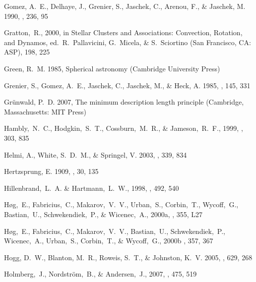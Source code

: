 \begin{thebibliography}{99}
{Gomez}, A.~E., {Delhaye}, J., {Grenier}, S., {Jaschek}, C., {Arenou}, F., \&
  {Jaschek}, M. 1990, \aap, 236, 95

  Gratton,~R., 2000,
  in Stellar Clusters and Associations: Convection, Rotation, and Dynamos,
  ed.~R.~Pallavicini, G.~Micela, \& S.~Sciortino (San Francisco, CA: ASP),
  198, 225


{Green}, R.~M. 1985, {Spherical astronomy} (Cambridge University Press)

{Grenier}, S., {Gomez}, A.~E., {Jaschek}, C., {Jaschek}, M., \& {Heck}, A.
  1985, \aap, 145, 331

{Gr{\"u}nwald}, P.~D. 2007, {The minimum description length principle}
  (Cambridge, Massachusetts: {MIT Press})

  Hambly,~N.~C., Hodgkin,~S.~T., Cossburn,~M.~R., \& Jameson,~R.~F., 1999,
  \mnras, 303, 835

{Helmi}, A., {White}, S.~D.~M., \& {Springel}, V. 2003, \mnras, 339, 834

{Hertzsprung}, E. 1909, \apj, 30, 135

  Hillenbrand,~L.~A. \& Hartmann,~L.~W., 1998,
  \apj, 492, 540

  H{\o}g,~E., Fabricius,~C., Makarov,~V.~V., Urban,~S., Corbin,~T., Wycoff,~G., Bastian,~U., Schwekendiek,~P., \& Wicenec,~A., 2000a,
  \aap, 355, L27

  H{\o}g,~E., Fabricius,~C., Makarov,~V.~V., Bastian,~U., Schwekendiek,~P., Wicenec,~A., Urban,~S., Corbin,~T., \& Wycoff,~G., 2000b
    \aap, 357, 367

{Hogg}, D.~W., {Blanton}, M.~R., {Roweis}, S.~T., \& {Johnston}, K.~V. 2005,
  \apj, 629, 268

  Holmberg,~J., Nordstr\"{o}m,~B., \& Andersen,~J., 2007,
  \aap, 475, 519


\end{thebibliography}
